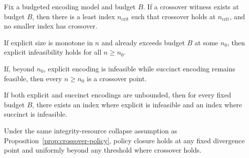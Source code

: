 \begin{proposition}\label{prop:least-divergence-point}
Fix a budgeted encoding model and budget \(B\). If a crossover witness exists at budget \(B\), then there is a least index \(n_{\mathrm{crit}}\) such that crossover holds at \(n_{\mathrm{crit}}\), and no smaller index has crossover.
\end{proposition}

\begin{proposition}\label{prop:eventual-explicit-infeasibility}
If explicit size is monotone in \(n\) and already exceeds budget \(B\) at some \(n_0\), then explicit infeasibility holds for all \(n\ge n_0\).
\end{proposition}

\begin{proposition}\label{prop:payoff-threshold}
If, beyond \(n_0\), explicit encoding is infeasible while succinct encoding remains feasible, then every \(n\ge n_0\) is a crossover point.
\end{proposition}

\begin{corollary}\label{cor:no-universal-survivor-no-succinct-bound}
If both explicit and succinct encodings are unbounded, then for every fixed budget \(B\), there exists an index where explicit is infeasible and an index where succinct is infeasible.
\end{corollary}

\begin{proposition}\label{prop:policy-closure-beyond-divergence}
Under the same integrity-resource collapse assumption as Proposition~\ref{prop:crossover-policy}, policy closure holds at any fixed divergence point and uniformly beyond any threshold where crossover holds.
\end{proposition}

